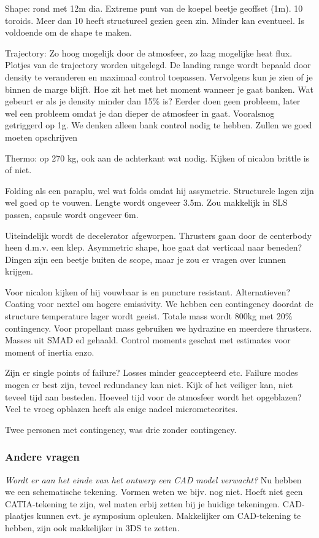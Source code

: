 Shape: rond met 12m dia. Extreme punt van de koepel beetje geoffset (1m). 10 toroids. Meer dan 10 heeft structureel gezien geen zin. Minder kan eventueel. Is voldoende om de shape te maken.

Trajectory: Zo hoog mogelijk door de atmosfeer, zo laag mogelijke heat flux. Plotjes van de trajectory worden uitgelegd. De landing range wordt bepaald door density te veranderen en maximaal control toepassen. Vervolgens kun je zien of je binnen de marge blijft. Hoe zit het met het moment wanneer je gaat banken. Wat gebeurt er als je density minder dan 15\% is? Eerder doen geen probleem, later wel een probleem omdat je dan dieper de atmosfeer in gaat. Vooralsnog getriggerd op 1g. We denken alleen bank control nodig te hebben. Zullen we goed moeten opschrijven

Thermo: op 270 kg, ook aan de achterkant wat nodig. Kijken of nicalon brittle is of niet.

Folding als een paraplu, wel wat folds omdat hij assymetric. Structurele lagen zijn wel goed op te vouwen. Lengte wordt ongeveer 3.5m. Zou makkelijk in SLS passen, capsule wordt ongeveer 6m. 

Uiteindelijk wordt de decelerator afgeworpen. Thrusters gaan door de centerbody heen d.m.v. een klep. Asymmetric shape, hoe gaat dat verticaal naar beneden? Dingen zijn een beetje buiten de scope, maar je zou er vragen over kunnen krijgen. 


Voor nicalon kijken of hij vouwbaar is en puncture resistant. Alternatieven? Coating voor nextel om hogere emissivity. 
We hebben een contingency doordat de structure temperature lager wordt geeist.
Totale mass wordt 800kg met 20\% contingency. 
Voor propellant mass gebruiken we hydrazine en meerdere thrusters. Masses uit SMAD ed gehaald. Control moments geschat met estimates voor moment of inertia enzo. 

Zijn er single points of failure? Losses minder geaccepteerd etc. Failure modes mogen er best zijn, teveel redundancy kan niet. Kijk of het veiliger kan, niet teveel tijd aan besteden. Hoeveel tijd voor de atmosfeer wordt het opgeblazen? Veel te vroeg opblazen heeft als enige nadeel micrometeorites.

Twee personen met contingency, was drie zonder contingency.
\subsubsection{Andere vragen}
\textit{Wordt er aan het einde van het ontwerp een CAD model verwacht?}\newline
Nu hebben we een schematische tekening. Vormen weten we bijv. nog niet. Hoeft niet geen CATIA-tekening te zijn, wel maten erbij zetten bij je huidige tekeningen. CAD-plaatjes kunnen evt. je symposium opleuken. Makkelijker om CAD-tekening te hebben, zijn ook makkelijker in 3DS te zetten. 

